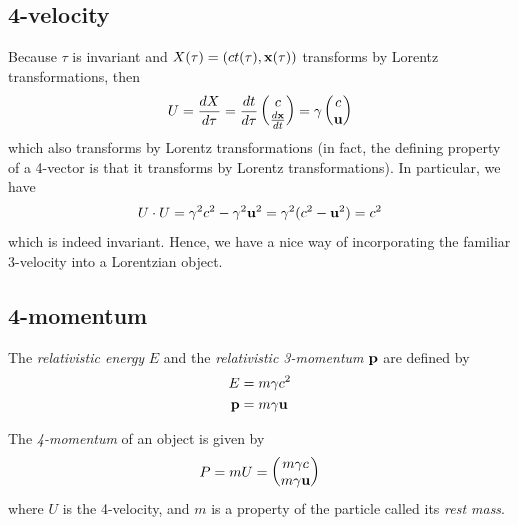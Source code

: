 \documentclass{../../template/note}
\begin{document}
    \subsection{4-velocity}

    Because \(\tau\) is invariant and \(X(\tau) = (ct(\tau), \V x(\tau))\) transforms by Lorentz transformations, then
    \begin{align*}
        U = \frac{dX}{d\tau} = \frac{dt}{d\tau} \begin{pmatrix}
         c \\
         \frac{d\V x}{dt} \\
        \end{pmatrix} = \gamma \begin{pmatrix}
         c \\
         \V u \\
        \end{pmatrix}
    \end{align*}
    which also transforms by Lorentz transformations (in fact, the defining property of a 4-vector is that it transforms by Lorentz transformations). In particular, we have
    \begin{align*}
        U \cdot U = \gamma^2c^2 - \gamma^2 \V u^2 = \gamma^2(c^2-\V u^2) = c^2
    \end{align*}
    which is indeed invariant. Hence, we have a nice way of incorporating the familiar 3-velocity into a Lorentzian object.
    
    

    \subsection{4-momentum}
    
    \begin{definition}
        The \emph{relativistic energy} \(E\) and the \emph{relativistic 3-momentum} \(\V p\) are defined by
        \begin{align*}
            E &= m\gamma c^2 \\
            \V p &= m\gamma \V u
        \end{align*}
    \end{definition}

    \begin{definition}[4-momentum]
        The \emph{4-momentum} of an object is given by
        \begin{align*}
            P = mU = \begin{pmatrix}
                m\gamma c \\
                m\gamma \V u \\
            \end{pmatrix}
        \end{align*}
        where \(U\) is the 4-velocity, and \(m\) is a property of the particle called its \emph{rest mass}.      
    \end{definition}
    
\end{document}
